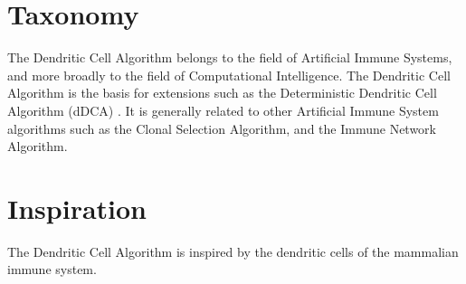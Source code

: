 \documentclass[a4paper, 11pt]{article}
\begin{document}
\section{Taxonomy}
\label{sec:taxonomy}
The Dendritic Cell Algorithm belongs to the field of Artificial Immune Systems, and more broadly to the field of Computational Intelligence.
The Dendritic Cell Algorithm is the basis for extensions such as the Deterministic Dendritic Cell Algorithm (dDCA) \cite{Greensmith2008}.
It is generally related to other Artificial Immune System algorithms such as the Clonal Selection Algorithm, and the Immune Network Algorithm.

\section{Inspiration}
\label{sec:inspiration}
The Dendritic Cell Algorithm is inspired by the dendritic cells of the mammalian immune system. 


\end{document}
